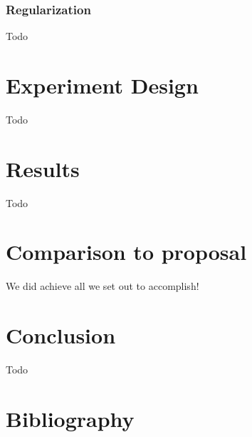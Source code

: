 \documentclass[11pt,letterpaper]{article}
\begin{document}
\subsubsection{Regularization}
Todo

\section{Experiment Design}
Todo
\section{Results}
Todo

\section{Comparison to proposal}
We did achieve all we set out to accomplish!

\section{Conclusion}
Todo



\section*{Bibliography}


%
%
\end{document}
